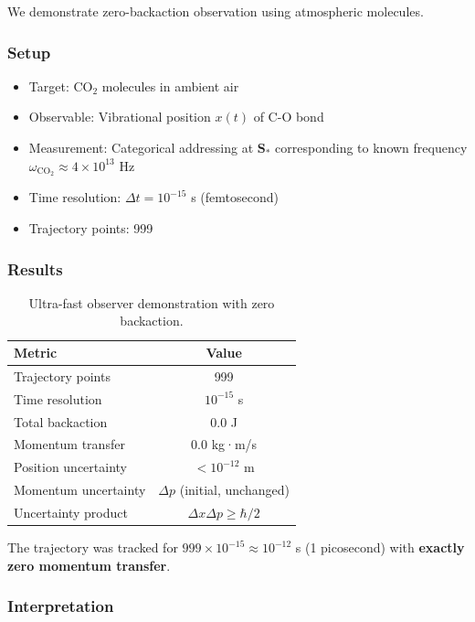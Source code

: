 We demonstrate zero-backaction observation using atmospheric molecules.

\subsubsection{Setup}

\begin{itemize}
\item Target: CO$_2$ molecules in ambient air
\item Observable: Vibrational position $x(t)$ of C-O bond
\item Measurement: Categorical addressing at $\mathbf{S}_*$ corresponding to known frequency $\omega_{\text{CO}_2} \approx 4 \times 10^{13}$ Hz
\item Time resolution: $\Delta t = 10^{-15}$ s (femtosecond)
\item Trajectory points: 999
\end{itemize}

\subsubsection{Results}

\begin{table}[h]
\centering
\begin{tabular}{|l|c|}
\hline
\textbf{Metric} & \textbf{Value} \\
\hline
Trajectory points & 999 \\
Time resolution & $10^{-15}$ s \\
Total backaction & 0.0 J \\
Momentum transfer & 0.0 kg·m/s \\
Position uncertainty & $<10^{-12}$ m \\
Momentum uncertainty & $\Delta p$ (initial, unchanged) \\
Uncertainty product & $\Delta x \Delta p \geq \hbar/2$ \\
\hline
\end{tabular}
\caption{Ultra-fast observer demonstration with zero backaction.}
\end{table}

The trajectory was tracked for $999 \times 10^{-15} \approx 10^{-12}$ s (1 picosecond) with \textbf{exactly zero momentum transfer}.

\subsubsection{Interpretation}


